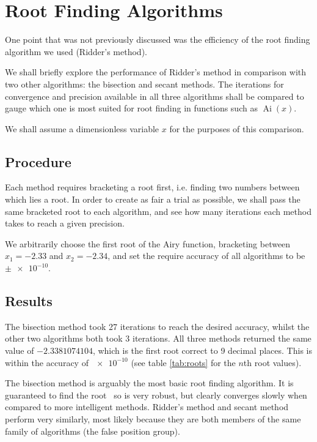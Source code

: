 \documentclass[]{article}
\newcommand{\Ai}[1]{\ensuremath{\operatorname{Ai}({#1})}}
\begin{document}
\section{Root Finding Algorithms}\label{sec:algorithms}

One point that was not previously discussed was the efficiency of the root finding algorithm we used (Ridder's method).

We shall briefly explore the performance of Ridder's method in comparison with two other algorithms: the bisection and secant methods. The iterations for convergence and precision available in all three algorithms shall be compared to gauge which one is most suited for root finding in functions such as \Ai{x}.

We shall assume a dimensionless variable $x$ for the purposes of this comparison.

\subsection{Procedure}\label{ssec:procedure}

Each method requires bracketing a root first, i.e. finding two numbers between which lies a root. In order to create as fair a trial as possible, we shall pass the same bracketed root to each algorithm, and see how many iterations each method takes to reach a given precision.

We arbitrarily choose the first root of the Airy function, bracketing between $x_{1} = -2.33$ and $x_{2} = -2.34$, and set the require accuracy of all algorithms to be $\pm\num{e-10}$.

\subsection{Results}\label{ssec:results}

The bisection method took 27 iterations to reach the desired accuracy, whilst the other two algorithms both took 3 iterations. All three methods returned the same value of  $-2.3381074104$, which is the first root correct to 9 decimal places. This is within the accuracy of $\num{e-10}$ (see table \ref{tab:roots} for the $n$th root values).

The bisection method is arguably the most basic root finding algorithm. It is guaranteed to find the root~\cite{ref:nr} so is very robust, but clearly converges slowly when compared to more intelligent methods. Ridder's method and secant method perform very similarly, most likely because they are both members of the same family of algorithms (the false position group).
\end{document}
